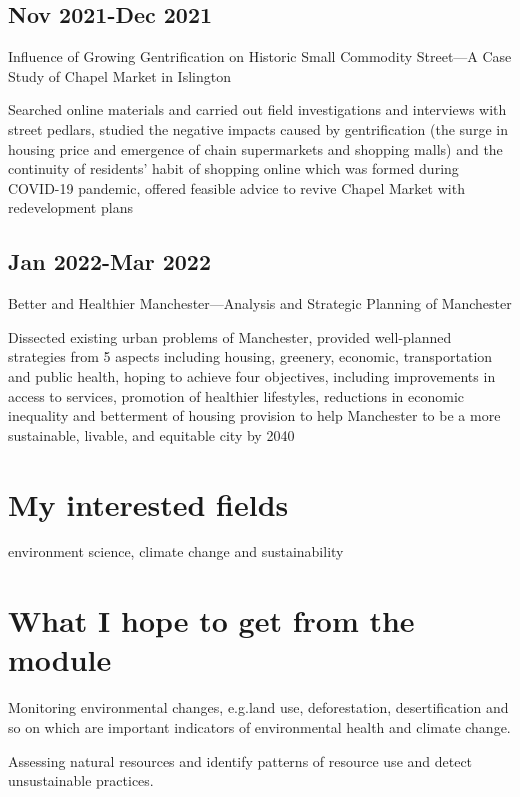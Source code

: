 \documentclass[
  letterpaper,
  DIV=11,
  numbers=noendperiod]{scrreprt}
\begin{document}
\subsection{Nov 2021-Dec 2021}\label{nov-2021-dec-2021-1}

Influence of Growing Gentrification on Historic Small Commodity
Street---A Case Study of Chapel Market in Islington

Searched online materials and carried out field investigations and
interviews with street pedlars, studied the negative impacts caused by
gentrification (the surge in housing price and emergence of chain
supermarkets and shopping malls) and the continuity of residents' habit
of shopping online which was formed during COVID-19 pandemic, offered
feasible advice to revive Chapel Market with redevelopment plans

\subsection{Jan 2022-Mar 2022}\label{jan-2022-mar-2022}

Better and Healthier Manchester---Analysis and Strategic Planning of
Manchester

Dissected existing urban problems of Manchester, provided well-planned
strategies from 5 aspects including housing, greenery, economic,
transportation and public health, hoping to achieve four objectives,
including improvements in access to services, promotion of healthier
lifestyles, reductions in economic inequality and betterment of housing
provision to help Manchester to be a more sustainable, livable, and
equitable city by 2040

\section{My interested fields}\label{my-interested-fields}

environment science, climate change and sustainability

\section{What I hope to get from the
module}\label{what-i-hope-to-get-from-the-module}

Monitoring environmental changes, e.g.land use, deforestation,
desertification and so on which are important indicators of
environmental health and climate change.

Assessing natural resources and identify patterns of resource use and
detect unsustainable practices.
\end{document}
